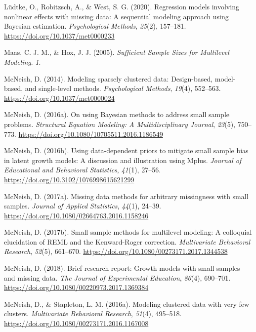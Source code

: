 \documentclass[
  letterpaper,
  11pt,
  english,
  singlespacing,
  headsepline,
  openany]{MastersDoctoralThesis}
\newlength{\cslhangindent}
\newenvironment{CSLReferences}[2] %
 {\begin{list}{}{%
  \setlength{\itemindent}{0pt}
  \setlength{\leftmargin}{0pt}
  \setlength{\parsep}{0pt}
  \ifodd #1
   \setlength{\leftmargin}{\cslhangindent}
   \setlength{\itemindent}{-1\cslhangindent}
  \fi
  \setlength{\itemsep}{#2\baselineskip}}}
 {\end{list}}
\begin{document}
\begin{CSLReferences}{1}{0}
Lüdtke, O., Robitzsch, A., \& West, S. G. (2020). Regression models
involving nonlinear effects with missing data: A sequential modeling
approach using {Bayesian} estimation. \emph{Psychological Methods},
\emph{25}(2), 157--181. \url{https://doi.org/10.1037/met0000233}

Maas, C. J. M., \& Hox, J. J. (2005). \emph{Sufficient {Sample Sizes}
for {Multilevel Modeling}}. \emph{1}.

McNeish, D. (2014). Modeling sparsely clustered data: {Design-based},
model-based, and single-level methods. \emph{Psychological Methods},
\emph{19}(4), 552--563. \url{https://doi.org/10.1037/met0000024}

McNeish, D. (2016a). On using {Bayesian} methods to address small sample
problems. \emph{Structural Equation Modeling: A Multidisciplinary
Journal}, \emph{23}(5), 750--773.
\url{https://doi.org/10.1080/10705511.2016.1186549}

McNeish, D. (2016b). Using data-dependent priors to mitigate small
sample bias in latent growth models: A discussion and illustration using
{Mplus}. \emph{Journal of Educational and Behavioral Statistics},
\emph{41}(1), 27--56. \url{https://doi.org/10.3102/1076998615621299}

McNeish, D. (2017a). Missing data methods for arbitrary missingness with
small samples. \emph{Journal of Applied Statistics}, \emph{44}(1),
24--39. \url{https://doi.org/10.1080/02664763.2016.1158246}

McNeish, D. (2017b). Small sample methods for multilevel modeling: A
colloquial elucidation of {REML} and the {Kenward-Roger} correction.
\emph{Multivariate Behavioral Research}, \emph{52}(5), 661--670.
\url{https://doi.org/10.1080/00273171.2017.1344538}

McNeish, D. (2018). Brief research report: {Growth} models with small
samples and missing data. \emph{The Journal of Experimental Education},
\emph{86}(4), 690--701.
\url{https://doi.org/10.1080/00220973.2017.1369384}

McNeish, D., \& Stapleton, L. M. (2016a). Modeling clustered data with
very few clusters. \emph{Multivariate Behavioral Research},
\emph{51}(4), 495--518.
\url{https://doi.org/10.1080/00273171.2016.1167008}


\end{CSLReferences}
\end{document}
